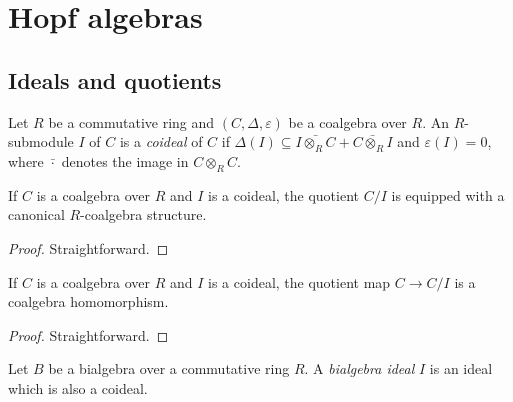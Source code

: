 \section{Hopf algebras}


\subsection{Ideals and quotients}


\begin{definition}[Coideal]
  \label{0-coideal}
  \uses{}

  Let $R$ be a commutative ring and $(C,\Delta,\varepsilon)$ be a coalgebra over $R$.
  An $R$-submodule $I$ of $C$ is a \emph{coideal} of $C$ if
  $\Delta(I) \subseteq \bar{I \otimes_R C} + \bar{C \otimes_R I}$ and $\varepsilon(I)=0$,
  where $\bar{\cdot}$ denotes the image in $C \otimes_R C$.
\end{definition}


\begin{proposition}
  \label{0-coquot}

  If $C$ is a coalgebra over $R$ and $I$ is a coideal,
  the quotient $C /I$ is equipped with a canonical $R$-coalgebra structure.
\end{proposition}
\begin{proof}
  \uses{}

  Straightforward.
\end{proof}


\begin{proposition}
  \label{0-coquot-hom}

  If $C$ is a coalgebra over $R$ and $I$ is a coideal,
  the quotient map $C \to C / I$ is a coalgebra homomorphism.
\end{proposition}
\begin{proof}
  \uses{}

  Straightforward.
\end{proof}


\begin{definition}
  \label{0-biideal}

  Let $B$ be a bialgebra over a commutative ring $R$.
  A \emph{bialgebra ideal} $I$ is an ideal which is also a coideal.
\end{definition}


